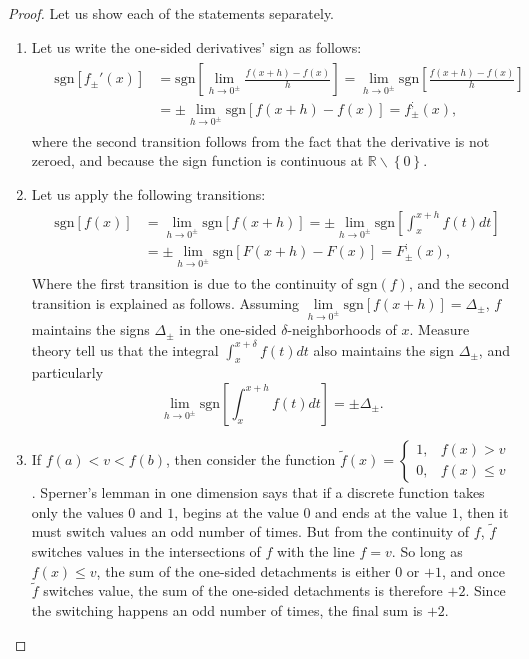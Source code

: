 \documentclass[11pt]{book}
\begin{document}
\begin{proof}Let us show each of the statements separately.
\begin{enumerate}
\item Let us write the one-sided derivatives' sign as follows: 
\begin{align}
&\begin{aligned}
\text{sgn}\left[ f_{\pm}'\left(x\right) \right] &= \text{sgn}\left[\underset{h\rightarrow0^{\pm}}{\lim}\frac{f\left(x+h\right)-f\left(x\right)}{h}\right]
=\underset{h\rightarrow0^{\pm}}{\lim}\text{sgn}\left[\frac{f\left(x+h\right)-f\left(x\right)}{h}\right] \\
&=\pm \underset{h\rightarrow0^{\pm}}{\lim}\text{sgn}\left[f\left(x+h\right)-f\left(x\right)\right]
=f_{\pm}^{;}\left(x\right),
\end{aligned}
\end{align}
where the second transition follows from the fact that the derivative is not zeroed, and because the sign function is continuous at $\mathbb{R}\backslash\left\{ 0\right\}.$
\item Let us apply the following transitions:
\begin{align}
&\begin{aligned}\text{sgn}\left[f\left(x\right)\right] &=\underset{h\rightarrow0^{\pm}}{\lim}\text{sgn}\left[f\left(x+h\right)\right]=\pm \underset{h\rightarrow0^{\pm}}{\lim}\text{sgn}\left[\int_x^{x+h}f\left(t\right)dt\right] \\ &=\pm \underset{h\rightarrow0^{\pm}}{\lim}\text{sgn}\left[F\left(x+h\right)-F\left(x\right)\right]=F_{\pm}^{;}\left(x\right),
\end{aligned}
\end{align}
Where the first transition is due to the continuity of $\text{sgn}\left(f\right)$, and the second transition is explained as follows. Assuming $\underset{h\rightarrow0^{\pm}}{\lim}\text{sgn}\left[f\left(x+h\right)\right]=\Delta_{\pm}$, $f$ maintains the signs $\Delta_{\pm}$ in the one-sided $\delta$-neighborhoods of $x$. Measure theory tell us that the integral $\int_x^{x+\delta} f\left(t\right)dt$ also maintains the sign $\Delta_{\pm}$, and particularly $$\underset{h\rightarrow0^{\pm}}{\lim}\text{sgn}\left[\int_x^{x+h}f\left(t\right)dt\right]=\pm\Delta_{\pm}.$$
\item If $f\left(a\right)<v<f\left(b\right)$, then consider the function $\widetilde{f}\left(x\right)=\begin{cases}
1, & f\left(x\right)>v\\
0, & f\left(x\right)\leq v
\end{cases}$. Sperner's lemman in one dimension says that if a discrete function takes only the values $0$ and $1$, begins at the value $0$ and ends at the value $1$, then it must switch values an odd number of times. But from the continuity of $f$, $\widetilde{f}$ switches values in the intersections of $f$ with the line $f=v$. So long as $f\left(x\right)\leq v$, the sum of the one-sided detachments is either $0$ or $+1$, and once $\widetilde{f}$ switches value, the sum of the one-sided detachments is therefore $+2$. Since the switching happens an odd number of times, the final sum is $+2$.


\end{enumerate}
\end{proof}
\end{document}
